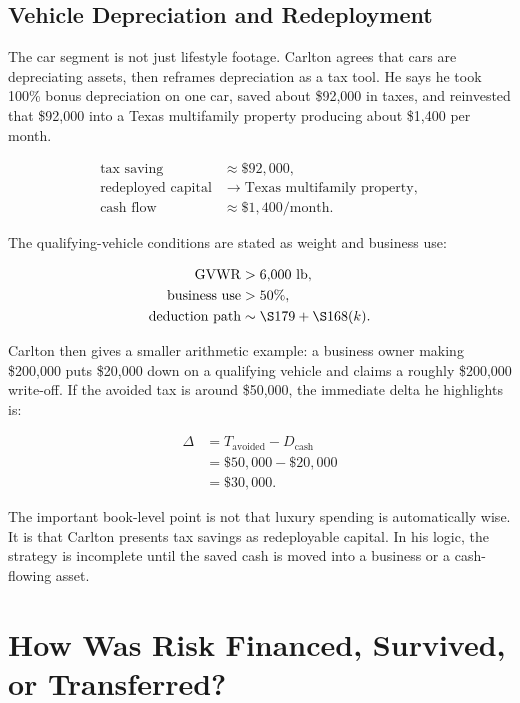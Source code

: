 \documentclass[11pt,oneside]{book}
\begin{document}
\section{Vehicle Depreciation and Redeployment}

The car segment is not just lifestyle footage. Carlton agrees that cars are depreciating assets, then reframes depreciation as a tax tool. He says he took 100\% bonus depreciation on one car, saved about \$92,000 in taxes, and reinvested that \$92,000 into a Texas multifamily property producing about \$1,400 per month.

\begin{align}
\text{tax saving} &\approx \$92{,}000,\\
\text{redeployed capital} &\longrightarrow \text{Texas multifamily property},\\
\text{cash flow} &\approx \$1{,}400/\text{month}.
\end{align}

The qualifying-vehicle conditions are stated as weight and business use:

\begin{align}
\mathrm{GVWR} &> 6{,}000\ \mathrm{lb},\\
\text{business use} &> 50\%,\\
\text{deduction path} &\sim \S 179+\S 168(k).
\end{align}

Carlton then gives a smaller arithmetic example: a business owner making \$200,000 puts \$20,000 down on a qualifying vehicle and claims a roughly \$200,000 write-off. If the avoided tax is around \$50,000, the immediate delta he highlights is:

\begin{align}
\Delta
&=T_{\mathrm{avoided}}-D_{\mathrm{cash}}\\
&=\$50{,}000-\$20{,}000\\
&=\$30{,}000.
\end{align}

The important book-level point is not that luxury spending is automatically wise. It is that Carlton presents tax savings as redeployable capital. In his logic, the strategy is incomplete until the saved cash is moved into a business or a cash-flowing asset.

\chapter{How Was Risk Financed, Survived, or Transferred?}
\end{document}
